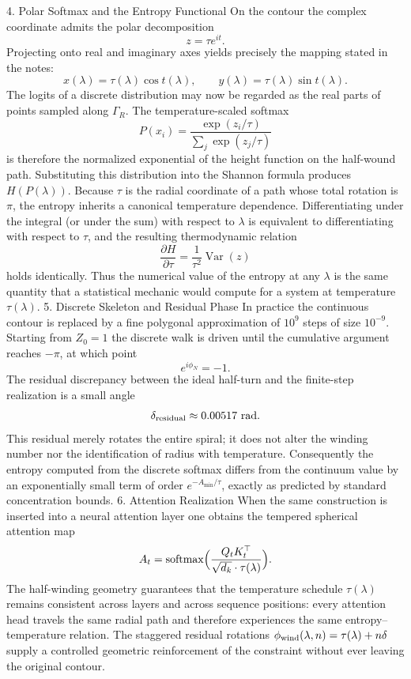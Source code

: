 4. Polar Softmax and the Entropy Functional
On the contour the complex coordinate admits the polar decomposition
\[
z=\tau e^{it}.
\]
Projecting onto real and imaginary axes yields precisely the mapping stated in the notes:
\[
x(\lambda)=\tau(\lambda)\cos t(\lambda),\qquad y(\lambda)=\tau(\lambda)\sin t(\lambda).
\]
The logits of a discrete distribution may now be regarded as the real parts of points sampled along \(\Gamma_R\). The temperature-scaled softmax
\[
P(x_i)=\frac{\exp(z_i/\tau)}{\sum_j\exp(z_j/\tau)}
\]
is therefore the normalized exponential of the height function on the half-wound path. Substituting this distribution into the Shannon formula produces \(H(P(\lambda))\).  
Because \(\tau\) is the radial coordinate of a path whose total rotation is \(\pi\), the entropy inherits a canonical temperature dependence. Differentiating under the integral (or under the sum) with respect to \(\lambda\) is equivalent to differentiating with respect to \(\tau\), and the resulting thermodynamic relation
\[
\frac{\partial H}{\partial\tau}=\frac{1}{\tau^2}\operatorname{Var}(z)
\]
holds identically. Thus the numerical value of the entropy at any \(\lambda\) is the same quantity that a statistical mechanic would compute for a system at temperature \(\tau(\lambda)\).
5. Discrete Skeleton and Residual Phase
In practice the continuous contour is replaced by a fine polygonal approximation of \(10^9\) steps of size \(10^{-9}\). Starting from \(Z_0=1\) the discrete walk is driven until the cumulative argument reaches \(-\pi\), at which point
\[
e^{i\phi_N}=-1.
\]
The residual discrepancy between the ideal half-turn and the finite-step realization is a small angle
\[
\delta_{\rm residual}\approx0.00517\text{ rad}.
\]
This residual merely rotates the entire spiral; it does not alter the winding number nor the identification of radius with temperature. Consequently the entropy computed from the discrete softmax differs from the continuum value by an exponentially small term of order \(e^{-A_{\min}/\tau}\), exactly as predicted by standard concentration bounds.
6. Attention Realization
When the same construction is inserted into a neural attention layer one obtains the tempered spherical attention map
\[
A_t=\operatorname{softmax}\Bigl(\frac{Q_tK_t^\top}{\sqrt{d_k}\cdot\tau(\lambda)}\Bigr).
\]
The half-winding geometry guarantees that the temperature schedule \(\tau(\lambda)\) remains consistent across layers and across sequence positions: every attention head travels the same radial path and therefore experiences the same entropy–temperature relation. The staggered residual rotations \(\phi_{\rm wind}(\lambda,n)=\tau(\lambda)+n\delta\) supply a controlled geometric reinforcement of the constraint without ever leaving the original contour.
